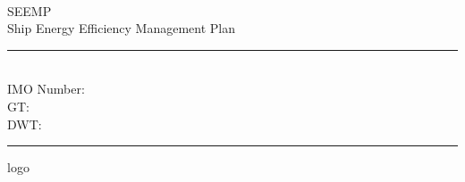 
\newcommand{\HRule}{\textcolor{greenheavy}{\rule{0.5\linewidth}{0.25mm}}}

\pagestyle{empty}

\begin{titlepage}
~\\
\vspace{4cm}
\begin{center}
\textcolor{greenheavy}{
\Huge{
SEEMP %
}\\
Ship Energy Efficiency Management Plan
}

\vspace{4cm}
\HRule
\textcolor{greenheavy}{
\LARGE{
\\
IMO Number: %
\\
GT: %
\\
DWT: %
\\
}
}
\HRule
\end{center}
\vfill
\noindent
\begin{minipage}{0.4\textwidth}
\begin{flushleft}
\large{
}
\end{flushleft}
\end{minipage}
\begin{minipage}{0.5\textwidth}
\begin{flushright}
\large{
logo
}
\end{flushright}
\end{minipage}
\end{titlepage}

\newpage